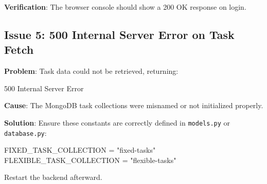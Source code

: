 \documentclass[12pt, a4paper]{article}
\begin{document}
        \textbf{Verification}: The browser console should show a 200 OK response on login.

    \subsection{Issue 5: 500 Internal Server Error on Task Fetch}

        \textbf{Problem}: Task data could not be retrieved, returning:
        
        \begin{monoblock}
            500 Internal Server Error
        \end{monoblock}
        
        \textbf{Cause}: The MongoDB task collections were misnamed or not initialized properly.
        
        \textbf{Solution}: Ensure these constants are correctly defined in \texttt{models.py} or \texttt{database.py}: 
        
        \begin{monoblock}
            FIXED\_TASK\_COLLECTION = "fixed-tasks"\\
            FLEXIBLE\_TASK\_COLLECTION = "flexible-tasks"
        \end{monoblock}
        
        Restart the backend afterward.

    
    
\end{document}
